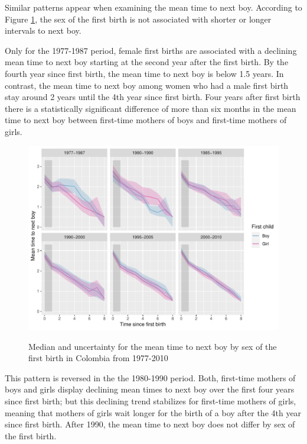 \documentclass[a4paper,left=1.25cm,right=1.25cm,top=1.25cm,bottom=1.25cm]{article}
\begin{document}
Similar patterns appear when examining the mean time to next boy. According to Figure \ref{fert_02}, the sex of the first birth is not associated with shorter or longer intervals to next boy. 

Only for the 1977-1987 period, female first births are associated with a declining mean time to next boy starting at the second year after the first birth. By the fourth year since first birth, the mean time to next boy is below 1.5 years. In contrast, the mean time to next boy among women who had a male first birth stay around 2 years until the 4th year since first birth. Four years after first birth there is a statistically significant difference of more than six months in the mean time to next boy between first-time mothers of boys and first-time mothers of girls. 

\begin{figure}[H]
\centering
    \includegraphics[scale=0.8]{Spells/Figures/colombia/colombia_period_new_2.pdf}\\
    \caption{Median and uncertainty for the mean time to next boy by sex of the first birth in Colombia from 1977-2010}
    \label{fert_02}
\end{figure}

This pattern is reversed in the the 1980-1990 period. Both, first-time mothers of boys and girls display declining mean times to next boy over the first four years since first birth; but this declining trend stabilizes for first-time mothers of girls, meaning that mothers of girls wait longer for the birth of a boy after the 4th year since first birth. After 1990, the mean time to next boy does not differ by sex of the first birth.
\end{document}
